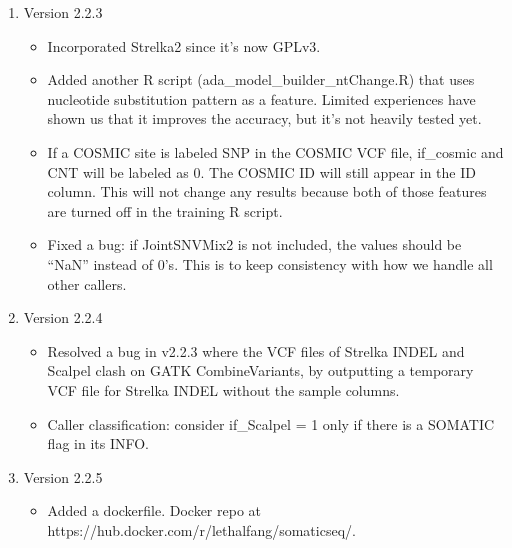 \documentclass[10pt,letterpaper]{article}
\begin{document}
\begin{sloppypar}
\begin{enumerate}
\begin{itemize}
		\end{itemize}
	
	
	
	\item Version 2.2.3
	
		\begin{itemize}
		
		  \item
		  Incorporated Strelka2 since it's now GPLv3.
		  
		  \item
		  Added another R script (ada\_model\_builder\_ntChange.R) that uses nucleotide substitution pattern as a feature. Limited experiences have shown us that it improves the accuracy, but it's not heavily tested yet. 
		
		  \item
		  If a COSMIC site is labeled SNP in the COSMIC VCF file, if\_cosmic and CNT will be labeled as 0. The COSMIC ID will still appear in the ID column. This will not change any results because both of those features are turned off in the training R script.
		  
		  \item
		  Fixed a bug: if JointSNVMix2 is not included, the values should be ``NaN'' instead of 0's. This is to keep consistency with how we handle all other callers.
		  
		\end{itemize}
	
	
	
	\item Version 2.2.4
	
		\begin{itemize}
		
		  \item
		  Resolved a bug in v2.2.3 where the VCF files of Strelka INDEL and Scalpel clash on GATK CombineVariants, by outputting a temporary VCF file for Strelka INDEL without the sample columns.
		  
		  \item
		  Caller classification: consider if\_Scalpel = 1 only if there is a SOMATIC flag in its INFO. 
		
		\end{itemize}
		
		
	
	\item Version 2.2.5
	
		\begin{itemize}
		  
		  \item
		  Added a dockerfile. Docker repo at https://hub.docker.com/r/lethalfang/somaticseq/. 
		  

\end{itemize}
\end{enumerate}
\end{sloppypar}
\end{document}
